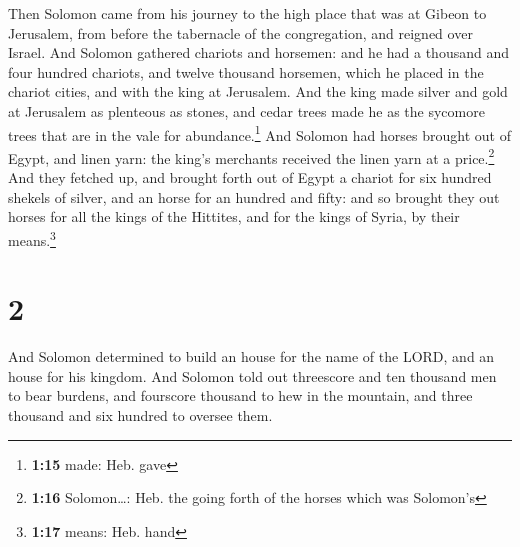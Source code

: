  Then Solomon came from his journey to the high place
that was at Gibeon to Jerusalem, from before the tabernacle of the
congregation, and reigned over Israel.  And Solomon
gathered chariots and horsemen: and he had a thousand and four hundred
chariots, and twelve thousand horsemen, which he placed in the chariot
cities, and with the king at Jerusalem.  And the king
made silver and gold at Jerusalem as plenteous as stones, and cedar
trees made he as the sycomore trees that are in the vale for
abundance.\footnote{\textbf{1:15} made: Heb. gave}  And
Solomon had horses brought out of Egypt, and linen yarn: the king's
merchants received the linen yarn at a price.\footnote{\textbf{1:16}
  Solomon\ldots: Heb. the going forth of the horses which was Solomon's}
 And they fetched up, and brought forth out of Egypt a
chariot for six hundred shekels of silver, and an horse for an hundred
and fifty: and so brought they out horses for all the kings of the
Hittites, and for the kings of Syria, by their means.\footnote{\textbf{1:17}
  means: Heb. hand}

\hypertarget{section-1}{%
\section{2}\label{section-1}}

 And Solomon determined to build an house for the name of
the LORD, and an house for his kingdom.  And Solomon told
out threescore and ten thousand men to bear burdens, and fourscore
thousand to hew in the mountain, and three thousand and six hundred to
oversee them.

